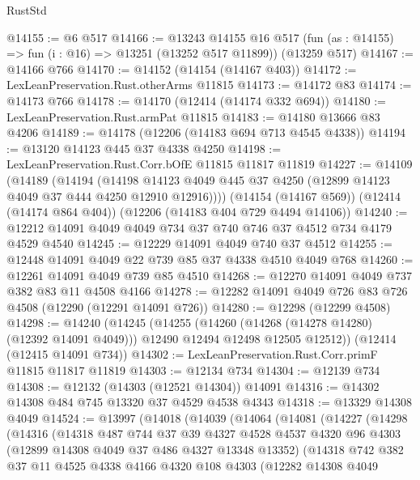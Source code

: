 \begin{lexlean}{RustStd}
\begin{coremodule}
{\begin{coremodule}
{{{{{{{{{{{{{{{{{{{{{{{{{{{{{{{{{{{{{{{{{{{{{{{{{{@14155 := @6 @517
@14166 := @13243
    @14155
    @16
    @517
    (fun (as : @14155) => fun (i : @16) => @13251 (@13252 @517 @11899))
    (@13259 @517)
@14167 := @14166 @766
@14170 := @14152 (@14154 (@14167 @403))
@14172 := LexLeanPreservation.Rust.otherArms @11815
@14173 := @14172 @83
@14174 := @14173 @766
@14178 := @14170 (@12414 (@14174 @332 @694))
@14180 := LexLeanPreservation.Rust.armPat @11815
@14183 := @14180 @13666 @83 @4206
@14189 := @14178 (@12206 (@14183 @694 @713 @4545 @4338))
@14194 := @13120 @14123 @445 @37 @4338 @4250
@14198 := LexLeanPreservation.Rust.Corr.bOfE @11815 @11817 @11819
@14227 := @14109
    (@14189
      (@14194
        (@14198 @14123 @4049 @445 @37 @4250 (@12899 @14123 @4049 @37 @444 @4250 @12910 @12916))))
    (@14154 (@14167 @569))
    (@12414 (@14174 @864 @404))
    (@12206 (@14183 @404 @729 @4494 @14106))
@14240 := @12212 @14091 @4049 @4049 @734 @37 @740 @746 @37 @4512 @734 @4179 @4529 @4540
@14245 := @12229 @14091 @4049 @740 @37 @4512
@14255 := @12448 @14091 @4049 @22 @739 @85 @37 @4338 @4510 @4049 @768
@14260 := @12261 @14091 @4049 @739 @85 @4510
@14268 := @12270 @14091 @4049 @737 @382 @83 @11 @4508 @4166
@14278 := @12282 @14091 @4049 @726 @83 @726 @4508 (@12290 (@12291 @14091 @726))
@14280 := @12298 (@12299 @4508)
@14298 := @14240
    (@14245
      (@14255
        (@14260 (@14268 (@14278 @14280) (@12392 @14091 @4049)))
        @12490
        @12494
        @12498
        @12505
        @12512))
    (@12414 (@12415 @14091 @734))
@14302 := LexLeanPreservation.Rust.Corr.primF @11815 @11817 @11819
@14303 := @12134 @734
@14304 := @12139 @734
@14308 := @12132 (@14303 (@12521 @14304)) @14091
@14316 := @14302 @14308 @484 @745 @13320 @37 @4529 @4538 @4343
@14318 := @13329 @14308 @4049
@14524 := @13997
    (@14018
      (@14039
        (@14064
          (@14081
            (@14227
              (@14298
                (@14316
                  (@14318
                    @487
                    @744
                    @37
                    @39
                    @4327
                    @4528
                    @4537
                    @4320
                    @96
                    @4303
                    (@12899 @14308 @4049 @37 @486 @4327 @13348 @13352)
                    (@14318
                      @742
                      @382
                      @37
                      @11
                      @4525
                      @4338
                      @4166
                      @4320
                      @108
                      @4303
                      (@12282
                        @14308
                        @4049
}}}}}}}}}}}}}}}}}}}}}}}}}}}}}}}}}}}}}}}}}}}}}}}}}}
\end{coremodule}}
\end{coremodule}
\end{lexlean}
